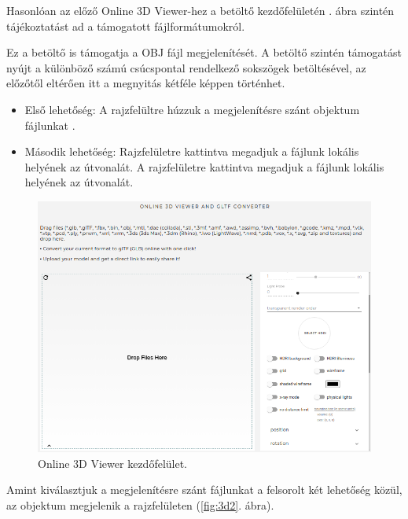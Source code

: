 Hasonlóan az előző Online 3D Viewer-hez a betöltő kezdőfelületén . ábra szintén tájékoztatást ad a támogatott fájlformátumokról.

Ez a betöltő is támogatja a OBJ fájl megjelenítését. A betöltő szintén támogatást nyújt a különböző számú csúcspontal rendelkező sokszögek betöltésével, az előzőtől eltérően itt a megnyitás kétféle képpen történhet.
\begin{itemize}
\item Első lehetőség:
A rajzfelültre húzzuk a megjelenítésre szánt objektum fájlunkat .
\item Második lehetőség:
Rajzfelületre kattintva megadjuk a fájlunk lokális helyének az útvonalát.
A rajzfelületre kattintva megadjuk a fájlunk lokális helyének az útvonalát.
\end{itemize}

\begin{figure}[h]
	\centering
	\includegraphics[width=\textwidth]{images/3D_creators.png}
	\caption{Online 3D Viewer kezdőfelület.}
	\label{fig:3d1}
\end{figure}

Amint kiválasztjuk a megjelenítésre szánt fájlunkat a felsorolt két lehetőség közül, az objektum megjelenik a rajzfelületen (\ref{fig:3d2}. ábra).

